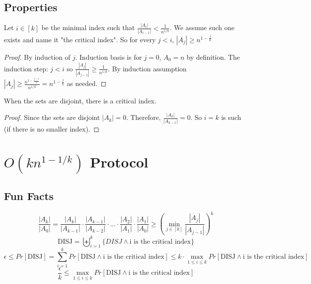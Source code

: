 \documentclass{article}
\begin{document}
\subsection{Properties}
\begin{claim}
Let $i \in [k]$ be the minimal index such that $\frac{|A_{i}|}{|A_{i-1}|} < \frac{1}{n^{1/k}}$. We assume such one exists and name it "the critical index". So for every $j < i$, $|A_j| \geq n^{1-\frac{j}{k}}$
\end{claim}
\begin{proof}
By induction of $j$. Induction basis is for $j = 0$, $A_0 = n$ by definition. The induction step: $j < i$ so $\frac{|A_{j}|}{|A_{j-1}|} \geq \frac{1}{n^{1/k}}$. By induction assumption $|A_{j}| \geq \frac{n^{1-\frac{j-1}{k}}}{n^{1/k}} = n^{1-\frac{j}{k}}$ as needed.
\end{proof}
\begin{claim}
When the sets are disjoint, there is a critical index.
\end{claim}
\begin{proof}
Since the sets are disjoint $|A_k| = 0$. Therefore, $\frac{|A_k|}{|A_{k-1}|} = 0$. So $i=k$ is such (if there is no smaller index).
\end{proof}
\section{$O(kn^{1-1/k})$ Protocol}
\subsection{Fun Facts}
\begin{equation*}
 \frac{|A_k|}{|A_0|} = \frac{|A_k|}{|A_{k-1}|}\cdot\frac{|A_{k-1}|}{|A_{k-2}|}\cdot...\cdot\frac{|A_2|}{|A_1|}\cdot\frac{|A_1|}{|A_0|} \geq \left( \min_{j \in [k]}{  \frac{|A_{j}|}{|A_{j-1}|}}\right )^k 
\end{equation*}
\begin{equation*}
 \text{DISJ} = \biguplus_{i=1}^{k}\{DISJ \land \text{i is the critical index} \} 
\end{equation*}
\begin{equation*}
    \epsilon \leq Pr[\text{DISJ}] = \sum\limits_{i=1}^k{Pr[\text{DISJ} \land \text{i is the critical index}]} \leq k \cdot \max_{1\leq i \leq k}{Pr[\text{DISJ} \land \text{i is the critical index}]} 
\end{equation*}
\begin{equation*}
    \frac{\epsilon}{k} \leq \max_{1\leq i \leq k}{Pr[\text{DISJ} \land \text{i is the critical index}]}
\end{equation*}
\end{document}

